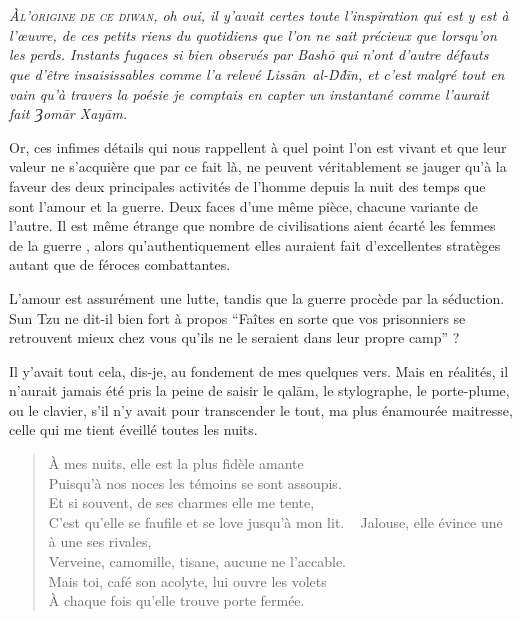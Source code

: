 



\section*{}
{\em\small
\lettrine[lines=4]{À}{l’origine de ce diwan,} oh oui, il y’avait certes toute l’inspiration qui est y est à l’œuvre, de ces petits riens du quotidiens que l’on ne sait précieux que lorsqu’on les perds. Instants fugaces si bien observés par Bashō qui n’ont d’autre défauts que d’être insaisissables comme l’a relevé Lissān~al-Ḋḋīn, et c’est malgré tout en vain qu’à travers la poésie je comptais en capter un instantané comme l’aurait fait Ȝomār Xayām.

Or, ces infimes détails qui nous rappellent à quel point l’on est vivant et que leur valeur ne s’acquière que par ce fait là, ne peuvent véritablement se jauger qu’à la faveur des deux principales activités de l’homme depuis la nuit des temps que sont l’amour et la guerre. Deux faces d’une même pièce, chacune variante de l’autre. Il est même étrange que nombre de civilisations aient écarté les femmes de la guerre , alors qu’authentiquement elles auraient fait d’excellentes stratèges autant que de féroces combattantes.

L’amour est assurément une lutte, tandis que la guerre procède par la séduction. Sun Tzu ne dit-il bien fort à propos \enquote{Faîtes en sorte que vos prisonniers se retrouvent mieux chez vous qu’ils ne le seraient dans leur propre camp} ?

Il y’avait tout cela, dis-je, au fondement de mes quelques vers. Mais en réalités, il n’aurait jamais été pris la peine de saisir le qalām, le stylographe, le porte-plume, ou le clavier, s’il n’y avait pour transcender le tout, ma plus énamourée maitresse, celle qui me tient éveillé toutes les nuits.
}

\versehangrightsquare
{}
\begin{verse}
À mes nuits, elle est la plus fidèle amante\\
Puisqu’à nos noces les témoins se sont assoupis.\\
Et si souvent, de ses charmes elle me tente,\\
C’est qu’elle se faufile et se love jusqu’à mon lit.
~
Jalouse, elle évince une à une ses rivales,\\
Verveine, camomille, tisane, aucune ne l’accable.\\
Mais toi, café son acolyte, lui ouvre les volets\\
À chaque fois qu’elle trouve porte fermée.
\end{verse}

